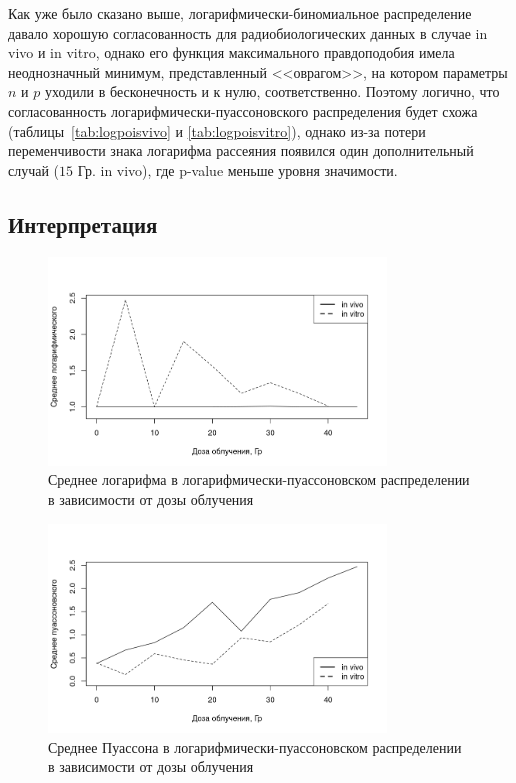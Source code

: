 \documentclass[12pt, specialist, subf, substylefile = spbu_report.rtx]{disser}
\begin{document}
	Как уже было сказано выше, логарифмически-биномиальное распределение давало хорошую согласованность для радиобиологических данных в случае in vivo и in vitro, однако его функция максимального правдоподобия имела неоднозначный минимум, представленный <<оврагом>>, на котором параметры $n$ и $p$ уходили в бесконечность и к нулю, соответственно. Поэтому логично, что согласованность логарифмически-пуассоновского распределения будет схожа (таблицы~\ref{tab:logpoisvivo} и \ref{tab:logpoisvitro}), однако из-за потери переменчивости знака логарифма рассеяния появился один дополнительный случай ($15$ Гр. in vivo), где p-value меньше уровня значимости.

	\subsection{Интерпретация}
	
	\begin{figure}[!ht]
		\centering
		\includegraphics[width = 0.8\textwidth]{logpoismeanlog}
		\caption{Среднее логарифма в логарифмически-пуассоновском распределении в зависимости от дозы облучения}
		\label{img:logpoismeanlog}
	\end{figure}
	
	\begin{figure}[!ht]
		\centering
		\includegraphics[width = 0.8\textwidth]{logpoismeanpois}
		\caption{Среднее Пуассона в логарифмически-пуассоновском распределении в зависимости от дозы облучения}
		\label{img:logpoismeanpois}
	\end{figure}
\end{document}
